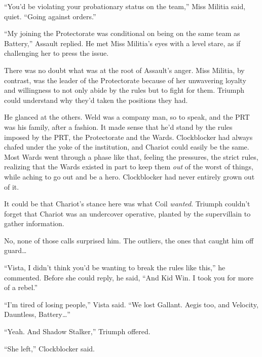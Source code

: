 ``You'd be violating your probationary status on the team,'' Miss Militia said, quiet.  ``Going against orders.''



``My joining the Protectorate was conditional on being on the same team as Battery,'' Assault replied.  He met Miss Militia's eyes with a level stare, as if challenging her to press the issue.



There was no doubt what was at the root of Assault's anger.  Miss Militia, by contrast, was the leader of the Protectorate because of her unwavering loyalty and willingness to not only abide by the rules but to fight for them.  Triumph could understand why they'd taken the positions they had.



He glanced at the others.  Weld was a company man, so to speak, and the PRT was his family, after a fashion.  It made sense that he'd stand by the rules imposed by the PRT, the Protectorate and the Wards.  Clockblocker had always chafed under the yoke of the institution, and Chariot could easily be the same.  Most Wards went through a phase like that, feeling the pressures, the strict rules, realizing that the Wards existed in part to keep them \emph{out} of the worst of things, while aching to go out and be a hero.  Clockblocker had never entirely grown out of it.



It could be that Chariot's stance here was what Coil \emph{wanted}.  Triumph couldn't forget that Chariot was an undercover operative, planted by the supervillain to gather information.



No, none of those calls surprised him.  The outliers, the ones that caught him off guard\ldots



``Vista, I didn't think you'd be wanting to break the rules like this,'' he commented.  Before she could reply, he said, ``And Kid Win.  I took you for more of a rebel.''



``I'm tired of losing people,'' Vista said.  ``We lost Gallant.  Aegis too, and Velocity, Dauntless, Battery\ldots''



``Yeah.  And Shadow Stalker,'' Triumph offered.



``She left,'' Clockblocker said.



